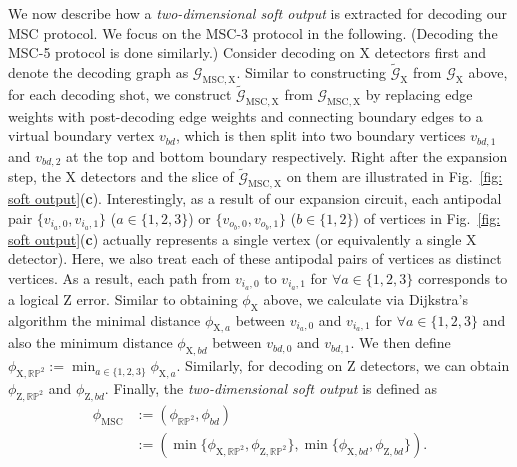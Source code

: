 \documentclass[reprint,aps,twocolumn,superscriptaddress,showpacs,notitlepage,10pt]{revtex4-2}
\theoremstyle{definition}
\begin{document}
We now describe how a \textit{two-dimensional soft output} is extracted for decoding our MSC protocol. We focus on the MSC-3 protocol in the following. (Decoding the MSC-5 protocol is done similarly.) Consider decoding on X detectors first and denote the decoding graph as $\mathcal{G}_{\mathrm{MSC,X}}$. Similar to constructing $\tilde{\mathcal{G}}_{\mathrm{X}}$ from $\mathcal{G}_{\mathrm{
X}}$ above, for each decoding shot, we construct $\tilde{\mathcal{G}}_{\mathrm{MSC},\mathrm{X}}$ from $\mathcal{G}_{\mathrm{MSC},\mathrm{X}}$ by replacing edge weights with post-decoding edge weights and connecting boundary edges to a virtual boundary vertex $v_{bd}$, which is then split into two boundary vertices $v_{bd,1}$ and $v_{bd,2}$ at the top and bottom boundary respectively. Right after the expansion step, the X detectors and the slice of $\tilde{\mathcal{G}}_{\mathrm{MSC,X}}$ on them are illustrated in Fig.~\ref{fig: soft output}(\textbf{c}). Interestingly, as a result of our expansion circuit,  each antipodal pair $\{v_{i_a,0},v_{i_a,1}\}$ ($a\in\{1,2,3\}$) or $\{v_{o_b,0},v_{o_b,1}\}$ ($b\in\{1,2\}$) of vertices in Fig.~\ref{fig: soft output}(\textbf{c}) actually represents a single vertex (or equivalently a single X detector). Here, we also treat each of these antipodal pairs of vertices as distinct vertices. As a result, each path from $v_{i_{a},0}$ to $v_{i_a,1}$ for $\forall a\in\{1,2,3\}$ corresponds to a logical $\mathrm{Z}$ error. Similar to obtaining $\phi_{\mathrm{X}}$ above, we calculate via Dijkstra's algorithm the minimal distance $\phi_{\mathrm{X},a}$ between $v_{i_a,0}$ and $v_{i_a,1}$ for $\forall a\in\{1,2,3\}$ and also the minimum distance $\phi_{\mathrm{X},bd}$ between $v_{bd,0}$ and $v_{bd,1}$. We then define $\phi_{\mathrm{X},\mathbb{RP}^2}:=\min_{a\in\{1,2,3\}}\phi_{\mathrm{X},a}$.  Similarly, for decoding on Z detectors, we can obtain $\phi_{\mathrm{Z},\mathbb{RP}^2}$ and $\phi_{\mathrm{Z},bd}$. Finally, the \textit{two-dimensional soft output} is defined as
\begin{align}
    \phi_{\mathrm{MSC}} & := (\phi_{\mathbb{RP}^2},\phi_{bd}) \nonumber \\
    & := (\min\{\phi_{\mathrm{X},\mathbb{RP}^2},\phi_{\mathrm{Z},\mathbb{RP}^2}\}, \min\{\phi_{\mathrm{X},bd},\phi_{\mathrm{Z},bd}\}).
\end{align}
\end{document}
